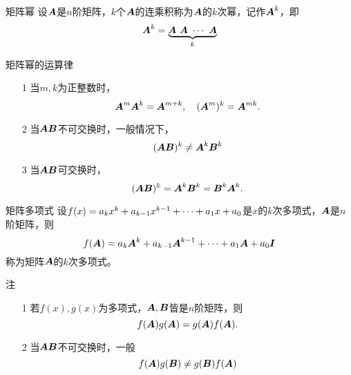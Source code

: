 \begin{frame}
  \begin{footnotesize}
    \begin{block}{矩阵幂}
      设$\boldsymbol{A}$是$n$阶矩阵，$k$个$\boldsymbol{A}$的连乘积称为$\boldsymbol{A}$的$k$次幂，记作$\boldsymbol{A}^k$，即
      $$
      \boldsymbol{A}^k = \underbrace{\boldsymbol{A}~ \boldsymbol{A}~ \cdots ~\boldsymbol{A}}_{k}
      $$
    \end{block}
    \pause 
    \begin{block}{矩阵幂的运算律}
      \begin{itemize}
      \item[1] 当$m,k$为正整数时，
        $$
        \boldsymbol{A}^m \boldsymbol{A}^k = \boldsymbol{A}^{m+k}, \quad
        (\boldsymbol{A}^m)^k = \boldsymbol{A}^{mk}.
        $$ \pause 
      \item[2]
        当$\boldsymbol{A}\boldsymbol{B}$不可交换时，一般情况下，
        $$
        (\boldsymbol{A}\boldsymbol{B})^k \ne \boldsymbol{A}^k\boldsymbol{B}^k 
        $$ \pause 
      \item[3]
        当$\boldsymbol{A}\boldsymbol{B}$可交换时，
        $$
        (\boldsymbol{A}\boldsymbol{B})^k = \boldsymbol{A}^k\boldsymbol{B}^k =  \boldsymbol{B}^k\boldsymbol{A}^k. 
        $$
      \end{itemize}
    \end{block}
  \end{footnotesize}
\end{frame}


\begin{frame}
  \begin{footnotesize}
    \begin{block}{矩阵多项式}
      设$f(x)=a_kx^k+a_{k-1}x^{k-1}+\cdots+a_1x+a_0$是$x$的$k$次多项式，$\boldsymbol{A}$是$n$阶矩阵，则
      $$
      f(\boldsymbol{A})=a_k\boldsymbol{A}^k+a_{k-1}\boldsymbol{A}^{k-1}+\cdots+a_1\boldsymbol{A}+a_0\boldsymbol{I}
      $$
      称为矩阵$\boldsymbol{A}$的$k$次多项式。
    \end{block}
    \pause 
    \begin{block}{注}
      \begin{itemize}
      \item[1] 若$f(x), g(x)$为多项式，$\boldsymbol{A},\boldsymbol{B}$皆是$n$阶矩阵，则
        $$
        f(\boldsymbol{A})g(\boldsymbol{A}) = g(\boldsymbol{A})f(\boldsymbol{A}).
        $$
      \item[2] 当$\boldsymbol{A}\boldsymbol{B}$不可交换时，一般
        $$f(\boldsymbol{A})g(\boldsymbol{B})\ne g(\boldsymbol{B})f(\boldsymbol{A})$$
      \end{itemize}
    \end{block}
  \end{footnotesize}
\end{frame}
